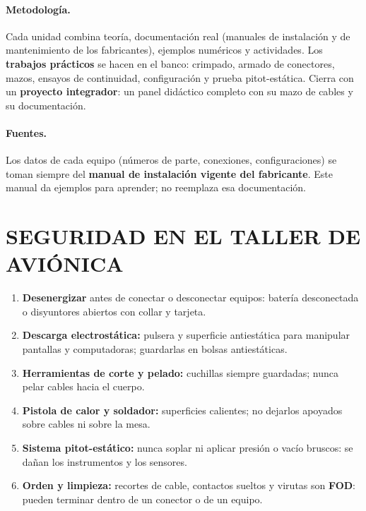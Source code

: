 \paragraph*{Metodología.} Cada unidad combina teoría, documentación real (manuales de instalación
y de mantenimiento de los fabricantes), ejemplos numéricos y actividades. Los \textbf{trabajos
prácticos} se hacen en el banco: crimpado, armado de conectores, mazos, ensayos de continuidad,
configuración y prueba pitot-estática. Cierra con un \textbf{proyecto integrador}: un panel
didáctico completo con su mazo de cables y su documentación.

\paragraph*{Fuentes.} Los datos de cada equipo (números de parte, conexiones, configuraciones) se
toman siempre del \textbf{manual de instalación vigente del fabricante}. Este manual da ejemplos
para aprender; no reemplaza esa documentación.

\section*{SEGURIDAD EN EL TALLER DE AVIÓNICA}
\begin{recuadro}
\begin{enumerate}
  \item \textbf{Desenergizar} antes de conectar o desconectar equipos: batería desconectada o
        disyuntores abiertos con collar y tarjeta.
  \item \textbf{Descarga electrostática:} pulsera y superficie antiestática para manipular
        pantallas y computadoras; guardarlas en bolsas antiestáticas.
  \item \textbf{Herramientas de corte y pelado:} cuchillas siempre guardadas; nunca pelar cables
        hacia el cuerpo.
  \item \textbf{Pistola de calor y soldador:} superficies calientes; no dejarlos apoyados sobre
        cables ni sobre la mesa.
  \item \textbf{Sistema pitot-estático:} nunca soplar ni aplicar presión o vacío bruscos: se dañan
        los instrumentos y los sensores.
  \item \textbf{Orden y limpieza:} recortes de cable, contactos sueltos y virutas son
        \textbf{FOD}: pueden terminar dentro de un conector o de un equipo.
\end{enumerate}
\end{recuadro}


